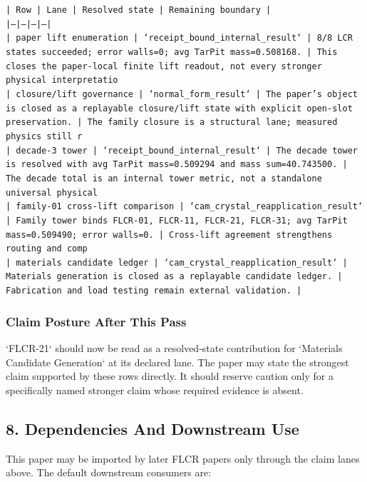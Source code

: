 \documentclass[11pt]{article}
\begin{document}
\noindent\texttt{| Row | Lane | Resolved state | Remaining boundary |}\\
\noindent\texttt{|---|---|---|---|}\\
\noindent\texttt{| paper lift enumeration | `receipt\_bound\_internal\_result` | 8/8 LCR states succeeded; error walls=0; avg TarPit mass=0.508168. | This closes the paper-local finite lift readout, not every stronger physical interpretatio}\\
\noindent\texttt{| closure/lift governance | `normal\_form\_result` | The paper's object is closed as a replayable closure/lift state with explicit open-slot preservation. | The family closure is a structural lane; measured physics still r}\\
\noindent\texttt{| decade-3 tower | `receipt\_bound\_internal\_result` | The decade tower is resolved with avg TarPit mass=0.509294 and mass sum=40.743500. | The decade total is an internal tower metric, not a standalone universal physical }\\
\noindent\texttt{| family-01 cross-lift comparison | `cam\_crystal\_reapplication\_result` | Family tower binds FLCR-01, FLCR-11, FLCR-21, FLCR-31; avg TarPit mass=0.509490; error walls=0. | Cross-lift agreement strengthens routing and comp}\\
\noindent\texttt{| materials candidate ledger | `cam\_crystal\_reapplication\_result` | Materials generation is closed as a replayable candidate ledger. | Fabrication and load testing remain external validation. |}\\

\subsubsection*{Claim Posture After This Pass}

`FLCR-21` should now be read as a resolved-state contribution for `Materials Candidate Generation` at its declared lane. The paper may state the strongest claim supported by these rows directly. It should reserve caution only for a specifically named stronger claim whose required evidence is absent.

\subsection*{8. Dependencies And Downstream Use}

This paper may be imported by later FLCR papers only through the claim lanes
above. The default downstream consumers are:
\end{document}
